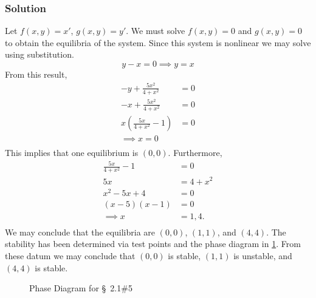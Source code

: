 \documentclass[12pt]{article}
\begin{document}
\subsubsection*{Solution}
Let $f(x,y) = x'$, $g(x,y) = y'$. We must solve $f(x,y)=0$ and $g(x,y)=0$ to
obtain the equilibria of the system. Since this system is nonlinear we may solve
using substitution.
\begin{equation}
  y - x = 0 \implies y = x
\end{equation}
From this result,
\begin{equation}
  \begin{aligned}
    -y+\frac{5x^2}{4+x^2} &= 0 \\
    -x+\frac{5x^2}{4+x^2} &= 0 \\
    x\left(\frac{5x}{4+x^2}-1 \right) &= 0 \\
    \implies x = 0 \\
\end{aligned}
\end{equation}
This implies that one equilibrium is $(0,0)$. Furthermore,
\begin{equation}
  \begin{aligned}
    \frac{5x}{4+x^2} -1 &= 0 \\
    5x &= 4+x^2 \\
    x^2-5x+4 &= 0 \\
    (x-5)(x-1) &= 0 \\
    \implies x &= 1, 4. \\
  \end{aligned}
\end{equation}
We may conclude that the equilibria are $(0,0)$, $(1,1)$, and $(4,4)$. The
stability has been determined via test points and the phase diagram in
\cref{fig:2.1.5-phase-diagram}. From these datum we may conclude that $(0,0)$ is
stable, $(1,1)$ is unstable, and $(4,4)$ is stable.

\begin{figure}
  \centering
  \caption{Phase Diagram for \S~2.1\#5}
  \label{fig:2.1.5-phase-diagram}
\end{figure}
\end{document}
